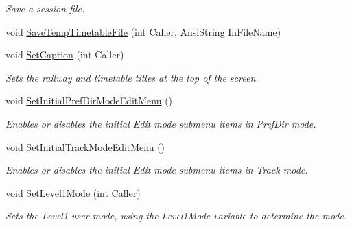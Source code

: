 \begin{DoxyCompactItemize}
\begin{DoxyCompactList}\small\item\em Save a session file. \end{DoxyCompactList}\item 
void \mbox{\hyperlink{class_t_interface_af4c5cddc6749a720766bf875c423fe79}{Save\+Temp\+Timetable\+File}} (int Caller, Ansi\+String In\+File\+Name)
\item 
\mbox{\label{class_t_interface_a974c6d5a224756b00ede1161e0fdf5f7}} 
void \mbox{\hyperlink{class_t_interface_a974c6d5a224756b00ede1161e0fdf5f7}{Set\+Caption}} (int Caller)
\begin{DoxyCompactList}\small\item\em Sets the railway and timetable titles at the top of the screen. \end{DoxyCompactList}\item 
\mbox{\label{class_t_interface_ac0cd2df9b806fc8909c2dcc584442fb5}} 
void \mbox{\hyperlink{class_t_interface_ac0cd2df9b806fc8909c2dcc584442fb5}{Set\+Initial\+Pref\+Dir\+Mode\+Edit\+Menu}} ()
\begin{DoxyCompactList}\small\item\em Enables or disables the initial Edit mode submenu items in Pref\+Dir mode. \end{DoxyCompactList}\item 
\mbox{\label{class_t_interface_a579c493d9b17fb9133a144b828d1105e}} 
void \mbox{\hyperlink{class_t_interface_a579c493d9b17fb9133a144b828d1105e}{Set\+Initial\+Track\+Mode\+Edit\+Menu}} ()
\begin{DoxyCompactList}\small\item\em Enables or disables the initial Edit mode submenu items in Track mode. \end{DoxyCompactList}\item 
\mbox{\label{class_t_interface_acf77f2eeeac0775fde4f25ba46099e0b}} 
void \mbox{\hyperlink{class_t_interface_acf77f2eeeac0775fde4f25ba46099e0b}{Set\+Level1\+Mode}} (int Caller)
\begin{DoxyCompactList}\small\item\em Sets the Level1 user mode, using the Level1\+Mode variable to determine the mode. \end{DoxyCompactList}\item 

\end{DoxyCompactItemize}
